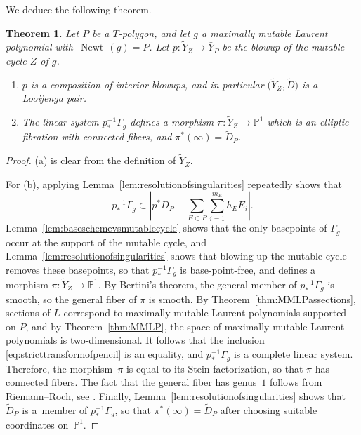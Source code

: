 \documentclass[pdftex]{sigma}
\numberwithin{equation}{section}
\newtheorem{Theorem}{Theorem}[section]
\DeclareMathOperator{\Newt}{{Newt \,}}
\newcommand{\PP}{\mathbb{P}}
\begin{document}
We deduce the following theorem.
\begin{Theorem}
	Let $P$ be a $T$-polygon, and let $g$ a maximally mutable Laurent polynomial with~${\Newt(g)=P}$. Let $p \colon \tilde{Y}_Z \rightarrow \bar{Y}_P$ be the blowup of the mutable cycle $Z$ of $g$.
	\begin{enumerate}[$(a)$]\itemsep=0pt
	\item $p$ is a composition of interior blowups, and in particular $\bigl(\tilde{Y}_Z, \tilde{D}\bigr)$ is a Looijenga pair.
	\item The linear system $p_*^{-1}\Gamma_g$ defines a morphism $\pi \colon \tilde{Y}_Z \rightarrow \PP^1$ which is an elliptic fibration with connected fibers, and $\pi^*(\infty)=\tilde{D}_P$.
	\end{enumerate}
\end{Theorem}
\begin{proof}
	(a) is clear from the definition of $\tilde{Y}_Z$.

	For (b), applying Lemma~\ref{lem:resolutionofsingularities} repeatedly shows that
	\begin{equation}\label{eq:stricttransformofpencil}
	p_*^{-1}\Gamma_g \subset 	\left|p^*D_P-\sum_{E \subset P}\sum_{i=1}^{m_E} h_E E_i\right|.
	\end{equation}
	Lemma~\ref{lem:baseschemevsmutablecycle} shows that the only basepoints of $\Gamma_g$ occur at the support of the mutable cycle, and Lemma~\ref{lem:resolutionofsingularities} shows that blowing up the mutable cycle removes these basepoints, so that $p_*^{-1}\Gamma_g$ is base-point-free, and defines a morphism $\pi \colon \tilde{Y}_Z \rightarrow \PP^1$. By Bertini's theorem, the general member of $p_*^{-1}\Gamma_g$ is smooth, so the general fiber of $\pi$ is smooth. By Theorem~\ref{thm:MMLPassections}, sections of $L$ correspond to maximally mutable Laurent polynomials supported on $P$, and by Theorem~\ref{thm:MMLP}, the space of maximally mutable Laurent polynomials is two-dimensional. It follows that the inclusion \eqref{eq:stricttransformofpencil} is an equality, and $p_*^{-1}\Gamma_g$ is a complete linear system. Therefore, the morphism~$\pi$ is equal to its Stein factorization, so that $\pi$ has connected fibers. The fact that the general fiber has genus~$1$ follows from Riemann--Roch, see \cite[Theorem 3.5]{Tveiten}. Finally, Lemma~\ref{lem:resolutionofsingularities} shows that~$\tilde{D}_P$ is a~member of $p_*^{-1}\Gamma_g$, so that $\pi^*(\infty)=\tilde{D}_P$ after choosing suitable coordinates on~$\PP^1$.
\end{proof}
\end{document}
